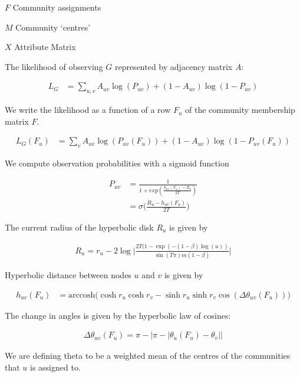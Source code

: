 \documentclass{article}
\begin{document}
	
	$F$ Community assignments
	
	$M$ Community `centres'
	
	$X$ Attribute Matrix
	
	
	\hrulefill
	
	The likelihood of observing $G$ represented by adjacency matrix $A$:
	
	\begin{align}
	L_G &= \sum_{u,v} A_{uv} \log(P_{uv}) + (1 - A_{uv}) \log(1 - P_{uv}) 
	\end{align}
	
	\hrulefill
	
	We write the likelihood as a function of a row $F_u$ of the community membership matrix $F$.
	
	\begin{align}
	L_G(F_u) &= \sum_{v} A_{uv} \log(P_{uv}(F_u)) + (1 - A_{uv}) \log(1 - P_{uv}(F_u))
	\end{align}
	
	We compute observation probabilities with a sigmoid function
	
	\begin{align}
	P_{uv} &= \frac{1}{1 + exp(\frac{h_{uv}(F_u) - R_u}{2T})} \\
	&= \sigma\bigg(\frac{R_u - h_{uv}(F_u)}{2T}\bigg)
	\end{align}
	
	The current radius of the hyperbolic disk $R_u$ is given by
	
	\begin{align}
	R_u = r_u - 2 \log \Bigg| \frac{2T(1 - \exp(-(1-\beta)\log(u))}{\sin(T\pi)m(1-\beta)}  \Bigg| 
	\end{align}
	
	Hyperbolic distance between nodes $u$ and $v$ is given by
	
	\begin{align}
	h_{uv}(F_u) &= \text{arccosh} \Bigg( \cosh r_u \cosh r_v - \sinh r_u \sinh r_v \cos(\Delta \theta_{uv}(F_u)) \Bigg)
	\end{align}
	
	The change in angles is given by the hyperbolic law of cosines:
	
	\begin{align}
	\Delta \theta_{uv}(F_u) = \pi - |\pi - |\theta_u(F_u) - \theta_v||
	\end{align}
	
	We are defining theta to be a weighted mean of the centres of the communities that $u$ is assigned to.
	
\end{document}
